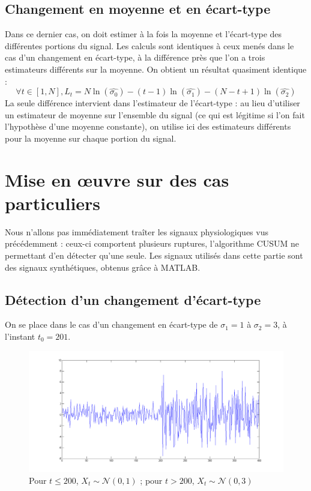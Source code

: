\documentclass[french,12pt,notitlepage]{report}
\begin{document}
	\subsection{Changement en moyenne et en écart-type}
	Dans ce dernier cas, on doit estimer à la fois la moyenne et l'écart-type des différentes portions du signal. Les calculs sont identiques à ceux menés dans le cas d'un changement en écart-type, à la différence près que l'on a trois estimateurs différents sur la moyenne. On obtient un résultat quasiment identique :
	\begin{equation}
		\forall t \in [1,N], L_t = N\ln (\hat{\sigma_0}) - (t-1) \ln (\hat{\sigma_1}) - (N - t + 1) \ln (\hat{\sigma_2})
		\label{bothchange}
	\end{equation}
	La seule différence intervient dans l'estimateur de l'écart-type : au lieu d'utiliser un estimateur de moyenne sur l'ensemble du signal (ce qui est légitime si l'on fait l'hypothèse d'une moyenne constante), on utilise ici des estimateurs différents pour la moyenne sur chaque portion du signal.
	
	\section{Mise en œuvre sur des cas particuliers}
	Nous n'allons pas immédiatement traîter les signaux physiologiques vus précédemment : ceux-ci comportent plusieurs ruptures, l'algorithme CUSUM ne permettant d'en détecter qu'une seule. Les signaux utilisés dans cette partie sont des signaux synthétiques, obtenus grâce à MATLAB.

	\subsection{Détection d'un changement d'écart-type}
	
	On se place dans le cas d'un changement en écart-type de $\sigma_1 = 1$ à $\sigma_2 = 3$, à l'instant $t_0 = 201$.
	
	\begin{figure}[h]
		\includegraphics[scale=0.4]{test_signal_std.png}
		\caption{Pour $t \leq 200$, $X_t \sim \mathcal{N}(0, 1)$ ; pour $t > 200$, $X_t \sim \mathcal{N}(0, 3)$}
		\label{test_signal_std}
	\end{figure}
	
\end{document}
